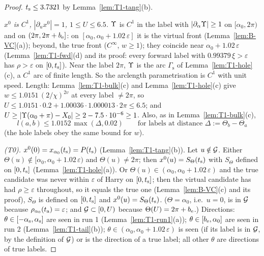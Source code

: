 \begin{proof}
$t_{\mathrm s}\le3.7321$ by Lemma~\ref{lem:T1-tang}(b).

\emph{$x^0$ is $C^1$, $|\partial_ux^0|=1$, $1\le U\le6.5$.} $\Upsilon$ is $C^1$ in the label with $|\partial_\alpha\Upsilon|\ge1$ on
$[\alpha_0,2\pi)$ and on $(2\pi,2\pi+b_{\mathrm e}]$: on $[\alpha_0,\alpha_0+1.02\,\varepsilon]$ it is the virtual front
(Lemma~\ref{lem:B-VC}(a)); beyond, the true front ($C^\infty$, $w\ge1$); they coincide near $\alpha_0+1.02\,\varepsilon$
(Lemma~\ref{lem:T1-fwd}(d) and its proof: every forward label with $0.99379\,\xi>\varepsilon$ has $\rho>\varepsilon$ on $[0,t_{\mathrm s}]$).
Near the label $2\pi$, $\Upsilon$ is the arc $\Gamma_{\mathrm s}$ of Lemma~\ref{lem:T1-hole}(c), a $C^1$ arc of finite length. So the
arclength parametrisation is $C^1$ with unit speed. Length: Lemma~\ref{lem:T1-bulk}(c) and Lemma~\ref{lem:T1-hole}(c) give
$w\le1.0151\,(2/\chi)^{2v}$ at every label $\ne2\pi$, so $U\le1.0151\cdot0.2+1.00036\cdot1.000013\cdot2\pi\le6.5$; and
$U\ge|\Upsilon(\alpha_0+\pi)-X_0|\ge2-7.5\cdot10^{-6}\ge1$. Also, as in Lemma~\ref{lem:T1-bulk}(c),
\begin{equation}\label{eq:T1-len}
l(a,b)\le1.0152\,\max(\Delta,0.02)\qquad\text{for labels at distance }\Delta:=\Theta_b-\Theta_a
\end{equation}
(the hole labels obey the same bound for $w$).

\emph{\textup{(T0)}.} $x^0(0)=x_{\alpha_0}(t_{\mathrm s})=P(t_{\mathrm s})$ (Lemma~\ref{lem:T1-tang}(b)). Let $u\notin\mathcal G$. Either
$\Theta(u)\notin[\alpha_0,\alpha_0+1.02\,\varepsilon)$ and $\Theta(u)\ne2\pi$; then $x^0(u)=S_\Theta(t_{\mathrm s})$ with $S_\Theta$ defined on
$[0,t_{\mathrm s}]$ (Lemma~\ref{lem:T1-hole}(a)). Or $\Theta(u)\in(\alpha_0,\alpha_0+1.02\,\varepsilon)$ and the true candidate was never within
$\varepsilon$ of Harry on $[0,t_{\mathrm s}]$; then the virtual candidate has had $\rho\ge\varepsilon$ throughout, so it equals the true one
(Lemma~\ref{lem:B-VC}(c) and its proof), $S_\Theta$ is defined on $[0,t_{\mathrm s}]$ and $x^0(u)=S_\Theta(t_{\mathrm s})$. ($\Theta=\alpha_0$, i.e.\
$u=0$, is in $\mathcal G$ because $\rho_{\alpha_0}(t_{\mathrm a})=\varepsilon$; and $\mathcal G\subset[0,U)$ because $\Theta(U)=2\pi+b_{\mathrm e}$.) Directions:
$\theta\in[-\alpha_{\mathrm s},\alpha_{\mathrm s}]$ are seen in run 1 (Lemma~\ref{lem:T1-run1}(a)); $\theta\in[b_{\mathrm e},\alpha_0]$ are seen in run 2
(Lemma~\ref{lem:T1-tail}(b)); $\theta\in(\alpha_0,\alpha_0+1.02\,\varepsilon)$ is seen (if its label is in $\mathcal G$, by the definition of
$\mathcal G$) or is the direction of a true label; all other $\theta$ are directions of true labels.


\end{proof}

